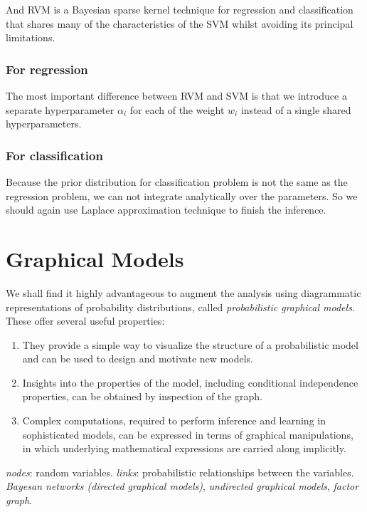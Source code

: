 \documentclass[a4paper]{book}
\begin{document}
And RVM is a Bayesian sparse kernel technique for regression and classification that shares many of the characteristics of the SVM whilst avoiding its principal limitations.

\subsubsection{For regression}
The most important difference between RVM and SVM is that we introduce a separate hyperparameter $\alpha_i$ for each of the weight $w_i$ instead of a single shared hyperparameters.
\subsubsection{For classification}
Because the prior distribution for classification problem is not the same as the regression problem, we can not integrate analytically  over the parameters.  So we should again use Laplace approximation technique to finish the inference.


\section{Graphical Models}
We shall find it highly advantageous to augment the analysis using diagrammatic representations of probability distributions, called \textit{probabilistic graphical models}. These offer several useful properties:
\begin{enumerate}
    \item They provide a simple way to visualize the structure of a probabilistic model and can be used to design and motivate new models.
    \item Insights into the properties of the model, including conditional independence properties, can be obtained by inspection of the graph.
    \item Complex computations, required to perform inference and learning in sophisticated models, can be expressed in terms of graphical manipulations, in which underlying mathematical expressions are carried along implicitly.
\end{enumerate}
\textit{nodes}: random variables. \textit{links}: probabilistic relationships between the variables.
\newline
\textit{Bayesan networks (directed graphical models)}, \textit{undirected graphical models}, \textit{factor graph}.
\end{document}
